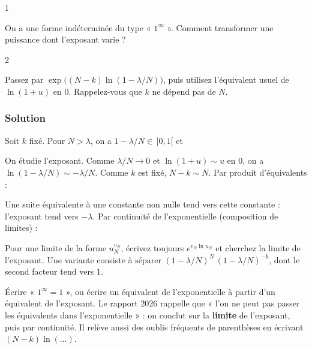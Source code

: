 \documentclass[11pt,a4paper]{article}
\newcommand{\equationajustee}[1]{%
  \sbox{\boiteequation}{$\displaystyle #1$}%
  \ifdim\wd\boiteequation>\linewidth
    \[\resizebox{\linewidth}{!}{\usebox{\boiteequation}}\]%
  \else
    \[#1\]%
  \fi}
\begin{document}
\begin{indication}{1}

On a une forme indéterminée du type « \(1^\infty\) ». Comment transformer une puissance dont l'exposant varie ?

\end{indication}

\begin{indication}{2}

Passez par \(\exp\big((N-k)\ln(1-\lambda/N)\big)\), puis utilisez l'équivalent usuel de \(\ln(1+u)\) en \(0\). Rappelez-vous que \(k\) ne dépend pas de \(N\).

\end{indication}

\hypertarget{solution-1}{%
\subsubsection{Solution}\label{solution-1}}

Soit \(k\) fixé. Pour \(N>\lambda\), on a \(1-\lambda/N\in\,]0,1[\) et

\equationajustee{\left(1-\frac\lambda N\right)^{N-k}=\exp\!\left[(N-k)\ln\!\left(1-\frac\lambda N\right)\right].}

On étudie l'exposant. Comme \(\lambda/N\to0\) et \(\ln(1+u)\sim u\) en \(0\), on a \(\ln(1-\lambda/N)\sim-\lambda/N\). Comme \(k\) est fixé, \(N-k\sim N\). Par produit d'équivalents :

\equationajustee{(N-k)\ln\!\left(1-\frac\lambda N\right)\sim-\lambda .}

Une suite équivalente à une constante non nulle tend vers cette constante : l'exposant tend vers \(-\lambda\). Par continuité de l'exponentielle (composition de limites) :

\equationajustee{\boxed{\lim_{N\to+\infty}\left(1-\frac\lambda N\right)^{N-k}=e^{-\lambda}.}}

\begin{methode}

Pour une limite de la forme \(u_N^{v_N}\), écrivez toujours \(e^{v_N\ln u_N}\) et cherchez la limite de l'exposant. Une variante consiste à séparer \((1-\lambda/N)^N\,(1-\lambda/N)^{-k}\), dont le second facteur tend vers \(1\).

\end{methode}

\begin{piege}

Écrire « \(1^\infty=1\) », ou écrire un équivalent de l'exponentielle à partir d'un équivalent de l'exposant. Le rapport 2026 rappelle que « l'on ne peut pas passer les équivalents dans l'exponentielle » : on conclut sur la \textbf{limite} de l'exposant, puis par continuité. Il relève aussi des oublis fréquents de parenthèses en écrivant \((N-k)\ln(\dots)\).

\end{piege}
\end{document}
